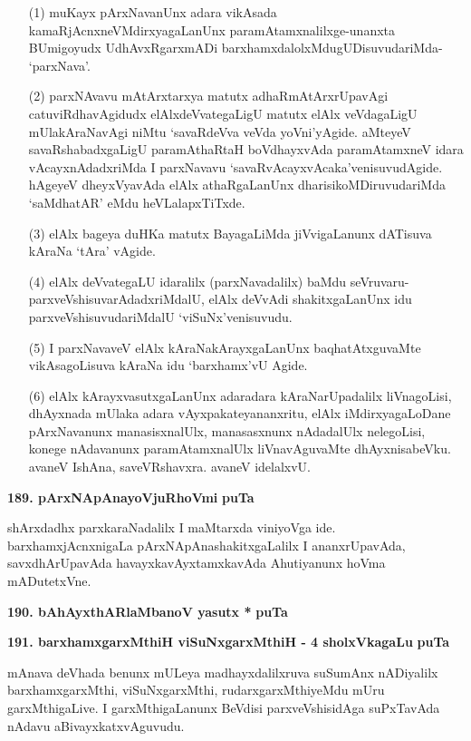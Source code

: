 \begin{itemize}
\item[(1)] muKayx pArxNavanUnx adara vikAsada kamaRjAcnxneVMdirxyagaLanUnx paramAtamxnalilxge-unanxta BUmi\-goyudx UdhAvxRgarxmADi barxhamxdalolxMdugUDisuvudariMda- `parxNava'.
\item[(2)] parxNAvavu mAtArxtarxya matutx adhaRmAtArxrUpavAgi catuviRdhavAgidudx elAlx\break deVvategaLigU matutx elAlx veVdagaLigU mUlakAraNavAgi niMtu `savaR\-deVva veVda yoVni'yAgide. aMteyeV savaR\-shabadx\-gaLigU paramAthaRtaH boVdhayxvAda paramAtamxneV idara vAcayxnAdadxriMda I parxNavavu `savaR\-vAcayx\-vAcaka'venisuvudAgide. hAgeyeV dheyxVyavAda elAlx athaRgaLanUnx dharisikoMDiruvuda\-riMda `saMdhatAR' eMdu heVLalapxTiTxde.
\item[(3)] elAlx bageya duHKa matutx BayagaLiMda jiVvigaLanunx dATisuva kAraNa `tAra' vAgide.
\item[(4)] elAlx deVvategaLU idaralilx (parxNavadalilx) baMdu seVruvaru-parxveVshisu\-varAdadxriMdalU, elAlx deVvAdi shakitxgaLanUnx idu parxveVshisuvudariMdalU `viSuNx'venisuvudu.
\item[(5)] I parxNavaveV elAlx kAraNakArayxgaLanUnx baqhatAtxguvaMte vikAsagoLisuva kAraNa idu `barxhamx'vU Agide.
\item[(6)] elAlx kArayxvasutxgaLanUnx adaradara kAraNarUpadalilx liVnagoLisi, dhAyxnada mUlaka adara vAyxpa\-kateyananxritu, elAlx iMdirxyagaLoDane pArxNavanunx manasisxnalUlx, manasasxnunx nAdadalUlx nele\-goLisi, konege nAdavanunx paramAtamxnalUlx liVnavAguvaMte dhAyxnisabeVku. avaneV IshAna, saveVRshavxra. avaneV idelalxvU.
\end{itemize}

\medskip
\noindent
\textbf{189. pArxNApAnayoVjuRhoVmi} \hfill{\bf puTa \pageref{186}}

\smallskip
shArxdadhx parxkaraNadalilx I maMtarxda viniyoVga ide. barxhamxjAcnxnigaLa pArxNApAnashakitxgaLalilx I ananxrUpa\-vAda, savxdhArUpavAda havayxkavAyxtamxkavAda Ahutiyanunx hoVma mADutetxVne.

\medskip
\noindent
\textbf{190. bAhAyxthARlaMbanoV yasutx *} \hfill{\bf puTa \pageref{225}}

\medskip
\noindent
\textbf{191. barxhamxgarxMthiH viSuNxgarxMthiH - 4 sholxVkagaLu} \hfill{\bf puTa \pageref{150}}

\smallskip
mAnava deVhada benunx mULeya madhayxdalilxruva suSumAnx nADiyalilx barxhamxgarxMthi, viSuNxgarxMthi, rudarxgarxMthiyeMdu mUru garxMthigaLive. I garxMthigaLanunx BeVdisi parxveVshisidAga suPxTavAda nAdavu aBi\-vayxkatxvAguvudu.

